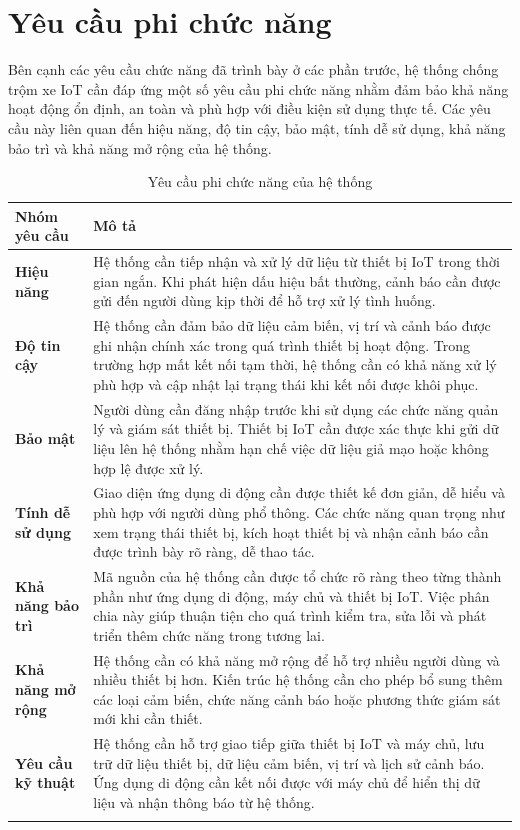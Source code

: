 \documentclass[../DoAn.tex]{subfiles}
\begin{document}
\section{Yêu cầu phi chức năng}
\label{section:2.4}

Bên cạnh các yêu cầu chức năng đã trình bày ở các phần trước, hệ thống chống trộm xe IoT cần đáp ứng một số yêu cầu phi chức năng nhằm đảm bảo khả năng hoạt động ổn định, an toàn và phù hợp với điều kiện sử dụng thực tế. Các yêu cầu này liên quan đến hiệu năng, độ tin cậy, bảo mật, tính dễ sử dụng, khả năng bảo trì và khả năng mở rộng của hệ thống.

\begin{longtable}{|>{\raggedright\arraybackslash}p{3.5cm}|>{\raggedright\arraybackslash}p{9.5cm}|}
\hline
\textbf{Nhóm yêu cầu} & \textbf{Mô tả} \\
\hline
\textbf{Hiệu năng} & Hệ thống cần tiếp nhận và xử lý dữ liệu từ thiết bị IoT trong thời gian ngắn. Khi phát hiện dấu hiệu bất thường, cảnh báo cần được gửi đến người dùng kịp thời để hỗ trợ xử lý tình huống. \\
\hline
\textbf{Độ tin cậy} & Hệ thống cần đảm bảo dữ liệu cảm biến, vị trí và cảnh báo được ghi nhận chính xác trong quá trình thiết bị hoạt động. Trong trường hợp mất kết nối tạm thời, hệ thống cần có khả năng xử lý phù hợp và cập nhật lại trạng thái khi kết nối được khôi phục. \\
\hline
\textbf{Bảo mật} & Người dùng cần đăng nhập trước khi sử dụng các chức năng quản lý và giám sát thiết bị. Thiết bị IoT cần được xác thực khi gửi dữ liệu lên hệ thống nhằm hạn chế việc dữ liệu giả mạo hoặc không hợp lệ được xử lý. \\
\hline
\textbf{Tính dễ sử dụng} & Giao diện ứng dụng di động cần được thiết kế đơn giản, dễ hiểu và phù hợp với người dùng phổ thông. Các chức năng quan trọng như xem trạng thái thiết bị, kích hoạt thiết bị và nhận cảnh báo cần được trình bày rõ ràng, dễ thao tác. \\
\hline
\textbf{Khả năng bảo trì} & Mã nguồn của hệ thống cần được tổ chức rõ ràng theo từng thành phần như ứng dụng di động, máy chủ và thiết bị IoT. Việc phân chia này giúp thuận tiện cho quá trình kiểm tra, sửa lỗi và phát triển thêm chức năng trong tương lai. \\
\hline
\textbf{Khả năng mở rộng} & Hệ thống cần có khả năng mở rộng để hỗ trợ nhiều người dùng và nhiều thiết bị hơn. Kiến trúc hệ thống cần cho phép bổ sung thêm các loại cảm biến, chức năng cảnh báo hoặc phương thức giám sát mới khi cần thiết. \\
\hline
\textbf{Yêu cầu kỹ thuật} & Hệ thống cần hỗ trợ giao tiếp giữa thiết bị IoT và máy chủ, lưu trữ dữ liệu thiết bị, dữ liệu cảm biến, vị trí và lịch sử cảnh báo. Ứng dụng di động cần kết nối được với máy chủ để hiển thị dữ liệu và nhận thông báo từ hệ thống. \\
\hline
\caption{Yêu cầu phi chức năng của hệ thống}
\label{table:non_functional_requirements}
\end{longtable}


\end{document}
